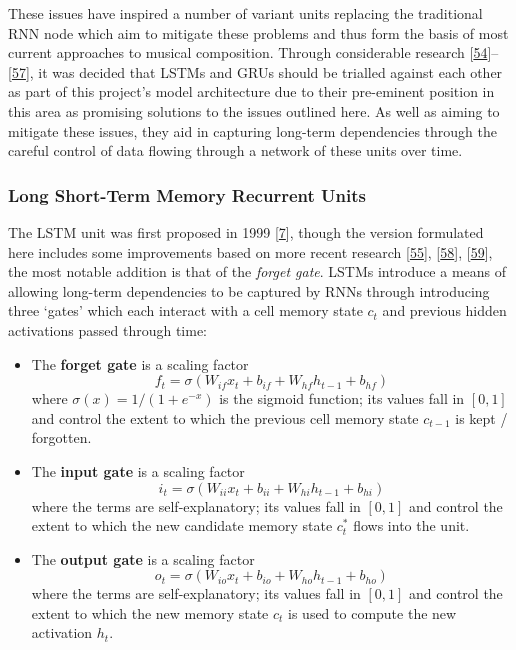 \documentclass[12pt,]{article}
\providecommand{\tightlist}{%
  \setlength{\itemsep}{0pt}\setlength{\parskip}{0pt}}
\begin{document}
These issues have inspired a number of variant units replacing the
traditional RNN node which aim to mitigate these problems and thus form
the basis of most current approaches to musical composition. Through
considerable research
{[}\protect\hyperlink{ref-lipton2015critical}{54}{]}--{[}\protect\hyperlink{ref-dey2017gate}{57}{]},
it was decided that LSTMs and GRUs should be trialled against each other
as part of this project's model architecture due to their pre-eminent
position in this area as promising solutions to the issues outlined
here. As well as aiming to mitigate these issues, they aid in capturing
long-term dependencies through the careful control of data flowing
through a network of these units over time.

\hypertarget{long-short-term-memory-recurrent-units}{%
\subsubsection{Long Short-Term Memory Recurrent
Units}\label{long-short-term-memory-recurrent-units}}

The LSTM unit was first proposed in 1999
{[}\protect\hyperlink{ref-gers1999learning}{7}{]}, though the version
formulated here includes some improvements based on more recent research
{[}\protect\hyperlink{ref-greff2017lstm}{55}{]},
{[}\protect\hyperlink{ref-sak2014long}{58}{]},
{[}\protect\hyperlink{ref-zebin2018human}{59}{]}, the most notable
addition is that of the \emph{forget gate}. LSTMs introduce a means of
allowing long-term dependencies to be captured by RNNs through
introducing three `gates' which each interact with a cell memory state
\(c_t\) and previous hidden activations passed through time:

\begin{itemize}
\tightlist
\item
  The \textbf{forget gate} is a scaling factor
  \[f_t = \sigma(W_{if} x_t + b_{if} + W_{hf} h_{t-1} + b_{hf})\] where
  \(\sigma(x) = 1 / (1 + e^{-x})\) is the sigmoid function; its values
  fall in \([0,1]\) and control the extent to which the previous cell
  memory state \(c_{t-1}\) is kept / forgotten.
\item
  The \textbf{input gate} is a scaling factor
  \[i_t = \sigma(W_{ii} x_t + b_{ii} + W_{hi} h_{t-1} + b_{hi})\] where
  the terms are self-explanatory; its values fall in \([0,1]\) and
  control the extent to which the new candidate memory state \(c^*_t\)
  flows into the unit.
\item
  The \textbf{output gate} is a scaling factor
  \[o_t = \sigma(W_{io} x_t + b_{io} + W_{ho} h_{t-1} + b_{ho})\] where
  the terms are self-explanatory; its values fall in \([0,1]\) and
  control the extent to which the new memory state \(c_t\) is used to
  compute the new activation \(h_t\).
\end{itemize}
\end{document}
